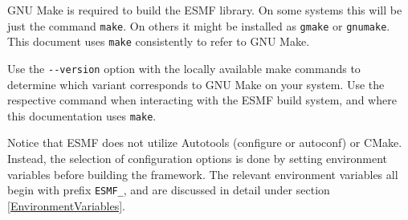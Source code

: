 

GNU Make is required to build the ESMF library.  On some
systems this will be just the command \texttt{make}.  On others
it might be installed as \texttt{gmake} or \texttt{gnumake}.
This document uses {\tt make} consistently to refer to GNU Make.

Use the {\tt \verb+--+version} option with the locally available make commands
to determine which variant corresponds to GNU Make on your system. Use the
respective command when interacting with the ESMF build system, and
where this documentation uses {\tt make}.

Notice that ESMF does not utilize Autotools (configure or autoconf) or CMake.
Instead, the selection of configuration options is done by setting environment
variables before building the framework. The relevant environment variables
all begin with prefix {\tt ESMF\_}, and are discussed in detail under section
\ref{EnvironmentVariables}.
